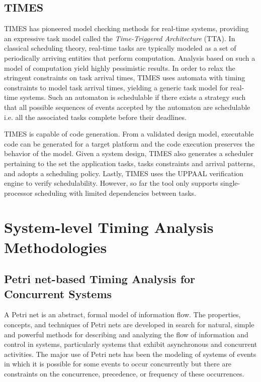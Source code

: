 \subsection{TIMES}

TIMES \cite{TIMES} has pioneered model checking methods for real-time systems, providing an expressive task model called the \emph{Time-Triggered Architecture} (TTA). In classical scheduling theory, real-time tasks are typically modeled as a set of periodically arriving entities that perform computation. Analysis based on such a model of computation yield highly pessimistic results. In order to relax the stringent constraints on task arrival times, TIMES uses automata with timing constraints to model task arrival times, yielding a generic task model for real-time systems. Such an automaton is schedulable if there exists a strategy such that all possible sequences of events accepted by the automaton are schedulable i.e. all the associated tasks complete before their deadlines. 

TIMES is capable of code generation. From a validated design model, executable code can be generated for a target platform and the code execution preserves the behavior of the model. Given a system design, TIMES also generates a scheduler pertaining to the set the application tasks, tasks constraints and arrival patterns, and adopts a scheduling policy. Lastly, TIMES uses the UPPAAL verification engine to verify schedulability. However, so far the tool only supports single-processor scheduling with limited dependencies between tasks. 

\section{System-level Timing Analysis Methodologies}

\subsection{Petri net-based Timing Analysis for Concurrent Systems}
\label{sec:petri_nets}

A Petri net \cite{peterson1977petri} is an abstract, formal model of information flow. The properties, concepts, and techniques of Petri nets are developed in search for natural, simple and powerful methods for describing and analyzing the flow of information and control in systems, particularly systems that exhibit asynchronous and concurrent activities. The major use of Petri nets has been the modeling of systems of events in which it is possible for some events to occur concurrently but there are constraints on the concurrence, precedence, or frequency of these occurrences. 

